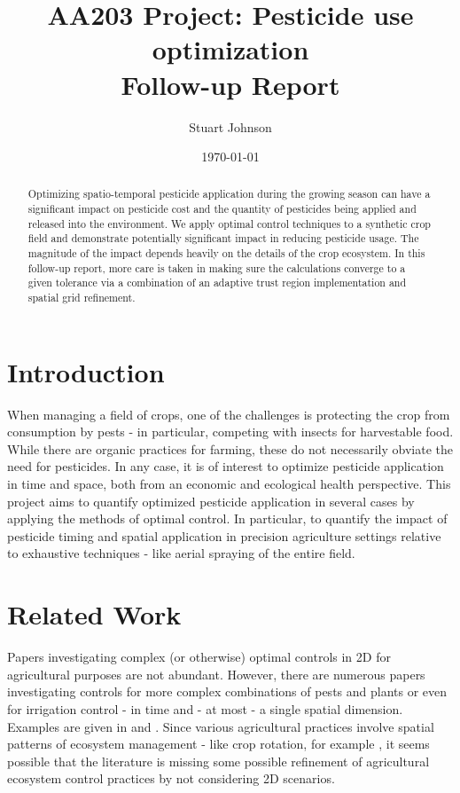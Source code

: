 \documentclass[11pt]{article}
\title{AA203 Project: Pesticide use optimization \\ Follow-up Report}
\author{Stuart Johnson}
\affil{stujohn@stanford.edu, stuart.g.johnson@gmail.com}
\date{\today}
\begin{document}
\maketitle

\begin{abstract}
Optimizing spatio-temporal pesticide application during the growing season can have a significant impact on pesticide cost and the quantity of pesticides being applied and released into the environment. We apply optimal control techniques to a synthetic crop field and demonstrate potentially significant impact in reducing pesticide usage. The magnitude of the impact depends heavily on the details of the crop ecosystem. In this follow-up report, more care is taken in making sure the calculations converge to a given tolerance via a combination of an adaptive trust region implementation and spatial grid refinement.
\end{abstract}

\section{Introduction}
When managing a field of crops, one of the challenges is protecting the crop from consumption by pests - in particular, competing with insects for harvestable food. While there are organic practices for farming, these do not necessarily obviate the need for pesticides. In any case, it is of interest to optimize pesticide application in time and space, both from an economic and ecological health perspective. This project aims to quantify optimized pesticide application in several cases by applying the methods of optimal control. In particular, to quantify the impact of pesticide timing and spatial application in precision agriculture settings relative to exhaustive techniques - like aerial spraying of the entire field.

\section{Related Work}
Papers investigating complex (or otherwise) optimal controls in 2D for agricultural purposes are not abundant. However, there are numerous papers investigating controls for more complex combinations of pests and plants or even for irrigation control - in time and - at most - a single spatial dimension. Examples are given in \cite{R1} and \cite{R2}. Since various agricultural practices involve spatial patterns of ecosystem management - like crop rotation, for example \cite{R3}, it seems possible that the literature is missing some possible refinement of agricultural ecosystem control practices by not considering 2D scenarios.
\end{document}
